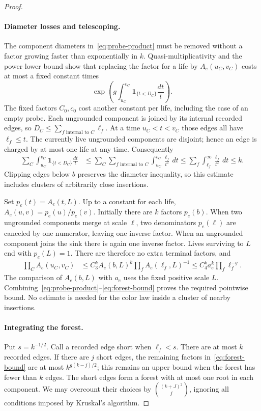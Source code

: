\begin{proof}
\paragraph{Diameter losses and telescoping.}
The component diameters in~\eqref{eq:probe-product} must be removed
without a factor growing faster than exponentially in $k$.
Quasi-multiplicativity and the power lower bound show that replacing
the factor for a life by $A_e(u_C,v_C)$ costs at most a fixed constant
times
\[
 \exp\!\left(g\int_{u_C}^{v_C}
                         \mathbf1_{\{t<D_C\}}\frac{dt}{t}\right).
\]
The fixed factors $C_0,c_0$ cost another constant per life, including
the case of an empty probe.  Each ungrounded component is joined by
its internal recorded edges, so
$D_C\leq\sum_{f\text{ internal to }C}\ell_f$.
At a time $u_C<t<v_C$ those edges all have $\ell_f\leq t$.
The currently live ungrounded components are disjoint; hence an edge
is charged by at most one life at any time.  Consequently
\begin{align}
 \sum_C\int_{u_C}^{v_C}\mathbf1_{\{t<D_C\}}\frac{dt}{t}
 &\leq\sum_C\sum_{f\text{ internal to }C}
                         \int_{u_C}^{v_C}\frac{\ell_f}{t^2}\,dt
 \leq\sum_f\int_{\ell_f}^{\infty}\frac{\ell_f}{t^2}\,dt
 \leq k.
 \label{eq:diameter-charge}
\end{align}
Clipping edges below $b$ preserves the diameter inequality, so this
estimate includes clusters of arbitrarily close insertions.

Set $p_e(t)=A_e(t,L)$.  Up to a constant for each life,
$A_e(u,v)=p_e(u)/p_e(v)$.  Initially there are $k$ factors $p_e(b)$.
When two ungrounded components merge at scale $\ell$, two denominators
$p_e(\ell)$ are canceled by one numerator, leaving one inverse
factor.  When an ungrounded component joins the sink there is again one
inverse factor.  Lives surviving to $L$ end with $p_e(L)=1$.
There are therefore no extra terminal factors, and
\begin{align}
 \prod_C A_e(u_C,v_C)
 &\leq C_3^k A_e(b,L)^k\prod_f A_e(\ell_f,L)^{-1}
 \leq C_4^k a_e^k\prod_f\ell_f^{-g}.
 \label{eq:forest-bound}
\end{align}
The comparison of $A_e(b,L)$ with $a_e$ uses the fixed positive scale
$L$.  Combining~\eqref{eq:probe-product}--\eqref{eq:forest-bound}
proves the required pointwise bound.  No estimate is needed for the
color law inside a cluster of nearby insertions.

\paragraph{Integrating the forest.}
Put $s=k^{-1/2}$.  Call a recorded edge short when $\ell_f<s$.
There are at most $k$ recorded edges.  If there are $j$ short edges,
the remaining factors in~\eqref{eq:forest-bound} are at most
$k^{g(k-j)/2}$; this remains an upper bound when the forest has fewer
than $k$ edges.  The short edges form a forest with at most one root in
each component.  We may overcount their choices by
$\binom{(k+J)^2}{j}$, ignoring all conditions imposed by Kruskal's
algorithm.


\end{proof}
